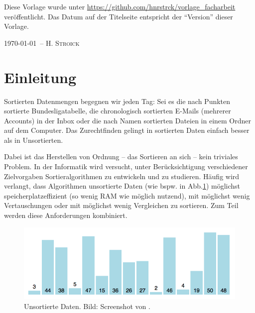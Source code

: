 \documentclass[11pt, a4paper, oneside, openright]{article}
\newcommand \bspw{bspw.\xspace }
\newcommand \Abb{Abb.\xspace }
\begin{document}
Diese Vorlage wurde unter \url{https://github.com/hnrstrck/vorlage_facharbeit} veröffentlicht. Das Datum auf der Titelseite entspricht der \enquote{Version} dieser Vorlage.

\vspace{1em}

\begin{center}
\end{center}

\vspace{1em}

\hfill\today~-- H. \textsc{Stroick}





\newpage
\section{Einleitung}
Sortierten Datenmengen begegnen wir jeden Tag: Sei es die nach Punkten sortierte Bundesligatabelle, die chronologisch sortierten E-Mails (mehrerer Accounts) in der Inbox oder die nach Namen sortierten Dateien in einem Ordner auf dem Computer. Das Zurechtfinden gelingt in sortierten Daten einfach besser als in Unsortierten.

Dabei ist das Herstellen von Ordnung -- das Sortieren an sich -- kein triviales Problem. In der Informatik wird versucht, unter Berücksichtigung verschiedener Zielvorgaben Sortieralgorithmen zu entwickeln und zu studieren. Häufig wird verlangt, dass Algorithmen unsortierte Daten (wie \bspw in \Abb\ref{fig:unsortierteDaten}) möglichst speicherplatzeffizient (so wenig RAM wie möglich nutzend), mit möglichst wenig Vertauschungen oder mit möglichst wenig Vergleichen zu sortieren. Zum Teil werden diese Anforderungen kombiniert.

\begin{figure}[H]
    \centering
    \includegraphics[width=12cm]{bilder/unsortierte_Daten.png}
    \caption[Unsortierte Daten.]{Unsortierte Daten. Bild: Screenshot von \cite{visualgoQS}.}
    \label{fig:unsortierteDaten}
\end{figure}
\end{document}
